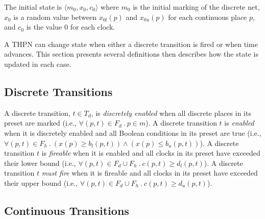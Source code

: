 \documentclass[11pt,times]{article}
\begin{document}
The initial state is $\langle m_0, x_0, c_0 \rangle$ where $m_0$ is the
initial marking of the discrete net, $x_0$ is a
random value between $x_{0l}(p)$ and $x_{0u}(p)$ for each continuous place $p$,
and $c_0$ is the value $0$ for each clock.


A THPN can change state when either a discrete transition is fired
or when time advances.  This section presents several definitions then 
describes how the state is updated in each case. 

\subsection{Discrete Transitions}

A discrete transition, $t \in T_d$, is {\em discretely enabled} when
all discrete places in its preset are marked 
(i.e., $\forall (p, t) \in F_d\ .\ p \in m$).
A discrete transition $t$ is {\em enabled} when it is discretely enabled and
all Boolean conditions in its preset are true  
(i.e., $\forall (p, t) \in F_h \ . \ (x(p) \geq b_l(p, t)) \wedge
(x(p) \leq b_u(p, t))$).  A discrete transition $t$ is {\em fireable} when
it is enabled and all clocks in its preset have exceeded their lower bound
(i.e., $\forall (p, t) \in F_d \cup F_h \ . \ c(p, t) \geq d_l(p, t)$).
A discrete transition $t$ {\em must fire} when it is fireable and
all clocks in its preset have exceeded their upper bound
(i.e., $\forall (p, t) \in F_d \cup F_h \ . \ c(p, t) \geq d_u(p, t)$).

\subsection{Continuous Transitions}
\end{document}
